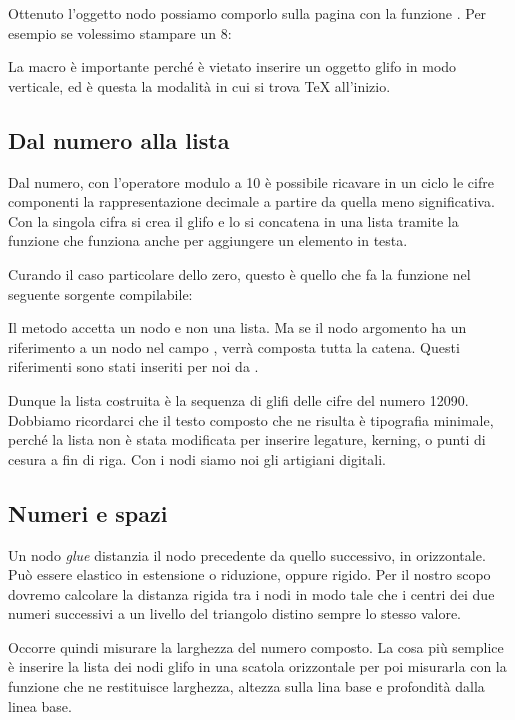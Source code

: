 Ottenuto l'oggetto nodo possiamo comporlo sulla pagina con la funzione
. Per esempio se volessimo stampare un 8:

La macro  è importante perché è vietato inserire un oggetto glifo
in modo verticale, ed è questa la modalità in cui si trova \TeX{} all'inizio.


\subsection{Dal numero alla lista}

Dal numero, con l'operatore modulo a 10 è possibile ricavare in un ciclo le
cifre componenti la rappresentazione decimale a partire da quella meno
significativa. Con la singola cifra si crea il glifo e lo si concatena in una
lista tramite la funzione  che funziona anche per
aggiungere un elemento in testa.

Curando il caso particolare dello zero, questo è quello che fa la funzione
 nel seguente sorgente compilabile:

Il metodo  accetta un nodo e non una lista. Ma se il nodo
argomento ha un riferimento a un nodo nel campo , verrà composta
tutta la catena. Questi riferimenti sono stati inseriti per noi da
.

Dunque la lista costruita è la sequenza di glifi delle cifre del numero 12090.
Dobbiamo ricordarci che il testo composto che ne risulta è tipografia minimale,
perché la lista non è stata modificata per inserire legature, kerning, o punti
di cesura a fin di riga. Con i nodi siamo noi gli artigiani digitali.


\subsection{Numeri e spazi}

Un nodo \emph{glue} distanzia il nodo precedente da quello successivo, in
orizzontale. Può essere elastico in estensione o riduzione, oppure rigido.
Per il nostro scopo dovremo calcolare la distanza rigida tra i nodi in modo
tale che i centri dei due numeri successivi a un livello del triangolo distino
sempre lo stesso valore.

Occorre quindi misurare la larghezza del numero composto. La cosa più semplice è
inserire la lista dei nodi glifo in una scatola orizzontale per poi misurarla
con la funzione  che ne restituisce larghezza, altezza sulla
lina base e profondità dalla linea base.

